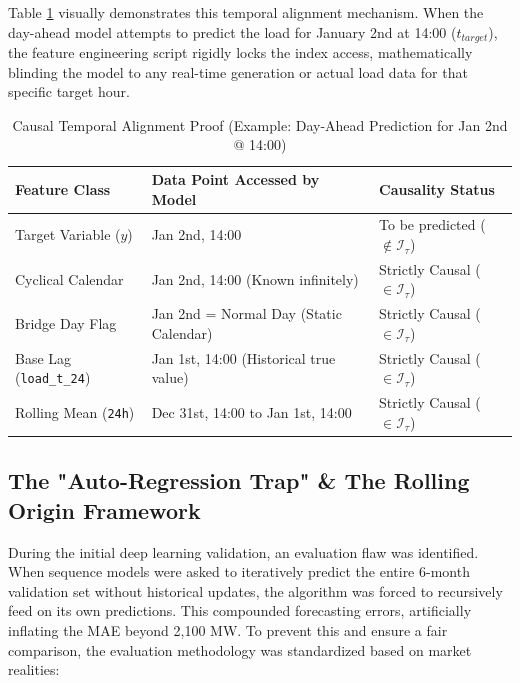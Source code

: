 \documentclass{article}
\begin{document}
Table \ref{tab:leakage_proof} visually demonstrates this temporal alignment mechanism. When the day-ahead model attempts to predict the load for January 2nd at 14:00 ($t_{target}$), the feature engineering script rigidly locks the index access, mathematically blinding the model to any real-time generation or actual load data for that specific target hour.

\begin{table}[ht]
\centering
\caption{Causal Temporal Alignment Proof (Example: Day-Ahead Prediction for Jan 2nd @ 14:00)}
\label{tab:leakage_proof}
\begin{tabular}{lll}
\toprule
\textbf{Feature Class} & \textbf{Data Point Accessed by Model} & \textbf{Causality Status} \\
\midrule
Target Variable ($y$) & Jan 2nd, 14:00 & To be predicted ($\notin \mathcal{I}_\tau$) \\
\midrule
Cyclical Calendar & Jan 2nd, 14:00 (Known infinitely) & Strictly Causal ($\in \mathcal{I}_\tau$) \\
Bridge Day Flag & Jan 2nd = Normal Day (Static Calendar) & Strictly Causal ($\in \mathcal{I}_\tau$) \\
Base Lag (\texttt{load\_t\_24}) & Jan 1st, 14:00 (Historical true value) & Strictly Causal ($\in \mathcal{I}_\tau$) \\
Rolling Mean (\texttt{24h}) & Dec 31st, 14:00 to Jan 1st, 14:00 & Strictly Causal ($\in \mathcal{I}_\tau$) \\
\bottomrule
\end{tabular}
\end{table}

\subsection*{The "Auto-Regression Trap" \& The Rolling Origin Framework}

During the initial deep learning validation, an evaluation flaw was identified. When sequence models were asked to iteratively predict the entire 6-month validation set without historical updates, the algorithm was forced to recursively feed on its own predictions. This compounded forecasting errors, artificially inflating the MAE beyond 2,100 MW. To prevent this and ensure a fair comparison, the evaluation methodology was standardized based on market realities:
\end{document}
